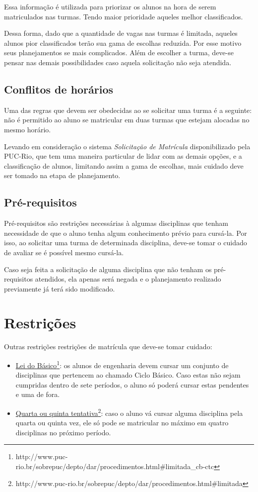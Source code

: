 \documentclass[graduacao,brazil]{ThesisPUC}
\begin{document}
Essa informação é utilizada para priorizar os alunos na hora de serem matriculados nas turmas. Tendo maior prioridade aqueles melhor classificados.  

Dessa forma, dado que a quantidade de vagas nas turmas é limitada, aqueles alunos pior classificados terão sua gama de escolhas reduzida. Por esse motivo seus planejamentos se mais complicados. Além de escolher a turma, deve-se pensar nas demais possibilidades caso aquela solicitação não seja atendida.

\subsection{Conflitos de horários}

Uma das regras que devem ser obedecidas ao se solicitar uma turma é a seguinte: não é permitido ao aluno se matricular em duas turmas que estejam alocadas no mesmo horário. 

Levando em consideração o sistema \textit{Solicitação de Matrícula} disponibilizado pela PUC-Rio, que tem uma maneira particular de lidar com as demais opções, e a classificação de alunos, limitando assim a gama de escolhas, mais cuidado deve ser tomado na etapa de planejamento.

\subsection{Pré-requisitos}

Pré-requisitos são restrições necessárias à algumas disciplinas que tenham necessidade de que o aluno tenha algum conhecimento prévio para cursá-la. Por isso, ao solicitar uma turma de determinada disciplina, deve-se tomar o cuidado de avaliar se é possível mesmo cursá-la. 

Caso seja feita a solicitação de alguma disciplina que não tenham os pré-requisitos atendidos, ela apenas será negada e o planejamento realizado previamente já terá sido modificado.

\section{Restrições}

Outras restrições restrições de matrícula que deve-se tomar cuidado:

\begin{itemize}
	\item \underline{Lei do Básico}\footnote{http://www.puc-rio.br/sobrepuc/depto/dar/procedimentos.html\#limitada\_cb-ctc}: os alunos de engenharia devem cursar um conjunto de disciplinas que pertencem ao chamado Ciclo Básico. Caso estas não sejam cumpridas dentro de sete períodos, o aluno só poderá cursar estas pendentes e uma de fora.
	\item \underline{Quarta ou quinta tentativa}\footnote{http://www.puc-rio.br/sobrepuc/depto/dar/procedimentos.html\#limitada}: caso o aluno vá cursar alguma disciplina pela quarta ou quinta vez, ele só pode se matricular no máximo em quatro disciplinas no próximo período.
\end{itemize}
\end{document}
